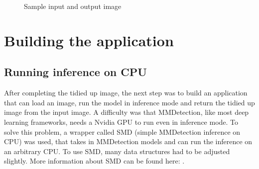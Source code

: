\begin{figure}[H]
    \centering
    \caption{\label{fig:sample-input-output} Sample input and output image}
\end{figure}

\section{Building the application}

\subsection{Running inference on CPU}
\label{inference-cpu}

After completing the tidied up image, the next step was to build an application that can load an image, run the model in inference mode and return the tidied up image from the input image. A difficulty was that MMDetection, like most deep learning frameworks, needs a Nvidia GPU to run even in inference mode. To solve this problem, a wrapper called SMD (simple MMDetection inference on CPU) was used, that takes in MMDetection models and can run the inference on an arbitrary CPU. To use SMD, many data structures had to be adjusted slightly. More information about SMD can be found here:  \cite{SMD}.

